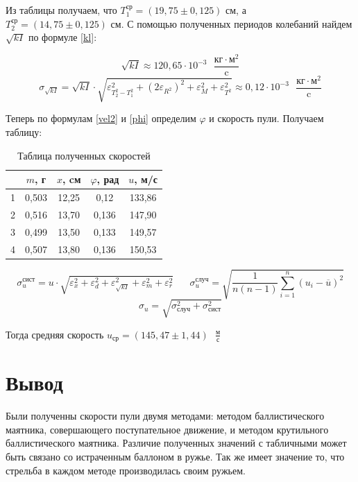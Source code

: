 \documentclass[a4paper,14pt]{extarticle}
\begin{document}
	Из таблицы получаем, что $T_1^{\text{ср}} = (19,75 \pm 0,125) \text{ см}$, а $T_2^{\text{ср}} = (14,75 \pm 0,125)\text{ см}$. С помощью полученных периодов колебаний найдем $\sqrt{kI}$ по формуле \eqref{kl}:
	
	$$\sqrt{kI} \approx 120,65 \cdot 10^{-3} \text{ } \dfrac{\text{кг}\cdot\text{м}^2}{\text{c}}$$ \;\;\;\;\;\; $$\sigma_{\sqrt{kI}} = \sqrt{kI} \cdot \sqrt{\varepsilon_{T_2^2-T_1^2}^2 + \left(2\varepsilon_{R^2}\right)^2 + \varepsilon_M^2 + \varepsilon_{T^2}^2} \approx 0,12 \cdot 10^{-3} \text{ } \dfrac{\text{кг}\cdot\text{м}^2}{\text{c}}$$
	
	Теперь по формулам \eqref{vel2} и \eqref{phi} определим $\varphi$ и скорость пули. Получаем таблицу:
	
	\begin{table}[!h]
		\centering
			\begin{tabular}{|c|c|c|c|c|}
				\hline
				& $m$, г& $x$, cм&  $\varphi$, рад& $u$, м/с\\
				\hline
				1 & 0,503 & 12,25 &0,12 & 133,86\\
				\hline
				2 &0,516  &13,70  & 0,136 & 147,90 \\
				\hline
				3 & 0,499 &13,50  &0,133  &149,57 \\
				\hline
				4 & 0,507 &13,80  & 0,136 & 150,53\\
				\hline 
			\end{tabular}
			\caption{Таблица полученных скоростей}
	\end{table}
	$$\sigma_u^{\text{сист}} = u\cdot \sqrt{ \varepsilon_x^2+ \varepsilon_d^2+ \varepsilon_{\sqrt{kI}}^2 + \varepsilon_m^2 + \varepsilon_r^2 } \;\;\;\;\;\; \sigma_u^{\text{случ}} =  \sqrt{\frac{1}{n(n-1)} \sum_{i=1}^{n}(u_i - \overline{u})^2}$$ \;\;\;\;\;\;
	$$\sigma_u = \sqrt{\sigma_{\text{случ}}^2 + \sigma_\text{сист}^2}
	$$
	
	Тогда средняя скорость \underline{$u_\text{ср} = (145,47 \pm 1,44)\text{ }\frac{\text{м}}{\text{с}} $}
	
	\section{Вывод}
	
	\indent Были полученны скорости пули двумя методами:  методом баллистического маятника, совершающего поступательное движение, и методом крутильного баллистического маятника. Различие полученных значений с табличными может быть связано со истраченным баллоном в ружье. Так же имеет значение то, что стрельба в каждом методе производилась своим ружьем.
	
\end{document}
